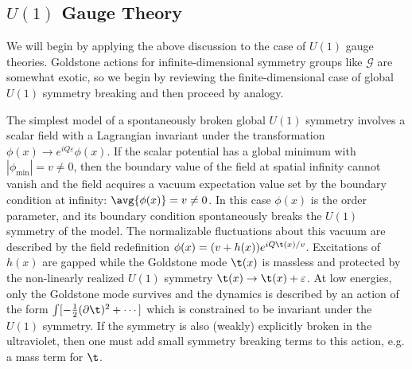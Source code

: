 \documentclass[11pt]{article}
\def\ve{{\varepsilon}}
\def\p{{\partial}}
\begin{document}
\subsection{$U(1)$ Gauge Theory}

We will begin by applying the above discussion to the case of $U(1)$ gauge theories. Goldstone actions for infinite-dimensional symmetry groups like $\mathcal{G}$ are somewhat exotic, so we begin by reviewing the finite-dimensional case of global $U(1)$ symmetry breaking and then proceed by analogy.



The simplest model of a spontaneously broken global $U(1)$ symmetry involves a scalar field with a Lagrangian invariant under the transformation $\phi(x) \to e^{ i Q \ve } \phi(x)$. If the scalar potential has a global minimum with $|\phi_{\text{min}}|=v\neq 0$, then the boundary value of the field at spatial infinity cannot vanish and the field acquires a vacuum expectation value set by the boundary condition at infinity: $\avg{ \phi(x) } = v \neq 0$. In this case $\phi(x)$ is the order parameter, and its boundary condition spontaneously breaks the $U(1)$ symmetry of the model.
The normalizable fluctuations about this vacuum are described by the field redefinition $\phi(x) = ( v + h(x) ) e^{ i Q \t (x) / v }$. Excitations of $h(x)$ are gapped while the Goldstone mode $\t(x)$ is massless and protected by the non-linearly realized $U(1)$ symmetry $\t(x) \to \t(x) + \ve$. At low energies, only the Goldstone mode survives and the dynamics is described by an action of the form $ \int  [ - \frac{1}{2} ( \p \t )^2 + \cdots ]$ which is constrained to be invariant under the $U(1)$ symmetry. If the symmetry is also (weakly) explicitly broken in the ultraviolet, then one must add small symmetry breaking terms to this action, e.g. a mass term for $\t$. 
\end{document}
